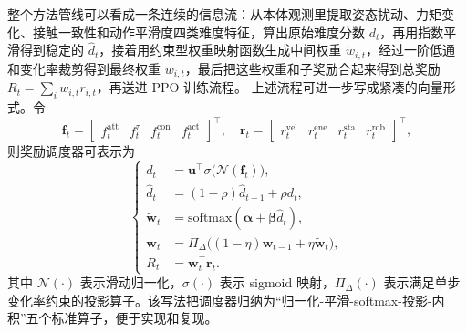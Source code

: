 \documentclass[12pt,a4paper]{ctexart}
\numberwithin{equation}{section}
\numberwithin{table}{section}
\numberwithin{figure}{section}
\newcommand{\subtopic}[1]{\par\addvspace{0.2\baselineskip}\ignorespaces}
\begin{document}
\subtopic{方法管线}
整个方法管线可以看成一条连续的信息流：从本体观测里提取姿态扰动、力矩变化、接触一致性和动作平滑度四类难度特征，算出原始难度分数 $d_t$，再用指数平滑得到稳定的 $\hat{d}_t$，接着用约束型权重映射函数生成中间权重 $\tilde{w}_{i,t}$，经过一阶低通和变化率裁剪得到最终权重 $w_{i,t}$，最后把这些权重和子奖励合起来得到总奖励 $R_t=\sum_i w_{i,t}r_{i,t}$，再送进 PPO 训练流程。
上述流程可进一步写成紧凑的向量形式。令
\begin{equation}
\bm{f}_t=\begin{bmatrix}f_t^{\text{att}}&f_t^{\tau}&f_t^{\text{con}}&f_t^{\text{act}}\end{bmatrix}^\top,
\quad
\bm{r}_t=\begin{bmatrix}r_t^{\text{vel}}&r_t^{\text{ene}}&r_t^{\text{sta}}&r_t^{\text{rob}}\end{bmatrix}^\top,
\end{equation}
则奖励调度器可表示为
\begin{equation}
\left\{
\begin{aligned}
d_t &= \bm{u}^\top\sigma\bigl(\mathcal{N}(\bm{f}_t)\bigr),\\
\hat d_t &= (1-\rho)\hat d_{t-1}+\rho d_t,\\
\tilde{\bm{w}}_t &= \mathrm{softmax}(\bm{\alpha}+\bm{\beta}\hat d_t),\\
\bm{w}_t &= \Pi_{\Delta}\bigl((1-\eta)\bm{w}_{t-1}+\eta\tilde{\bm{w}}_t\bigr),\\
R_t &= \bm{w}_t^\top\bm{r}_t.
\end{aligned}
\right.
\label{eq:scheduler_vector}
\end{equation}
其中 $\mathcal{N}(\cdot)$ 表示滑动归一化，$\sigma(\cdot)$ 表示 sigmoid 映射，$\Pi_{\Delta}(\cdot)$ 表示满足单步变化率约束的投影算子。该写法把调度器归纳为“归一化-平滑-softmax-投影-内积”五个标准算子，便于实现和复现。
\end{document}
